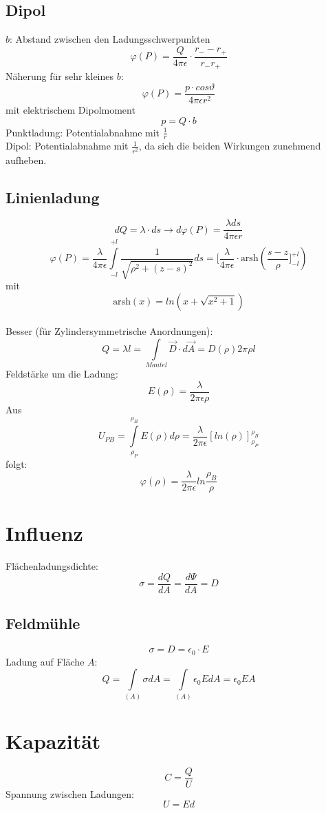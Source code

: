 \documentclass[12pt,a4paper]{article}
\begin{document}
\subsection{Dipol}
$b$: Abstand zwischen den Ladungsschwerpunkten
\[\varphi(P) = \frac{Q}{4\pi\epsilon} \cdot \frac{r_- -r_+}{r_-r_+}\]
Näherung für sehr kleines $b$:
\[\varphi(P) = \frac{p \cdot cos\vartheta}{4\pi\epsilon r^2}\]
mit elektrischem Dipolmoment \[p = Q \cdot b\]
Punktladung: Potentialabnahme mit $\frac{1}{r}$\\
Dipol: Potentialabnahme mit $\frac{1}{r^2}$,  da sich die beiden Wirkungen zunehmend aufheben.\\

\subsection{Linienladung}
\[dQ = \lambda \cdot ds \rightarrow d\varphi(P) = \frac{\lambda ds}{4\pi\epsilon r}\]
\[\varphi(P) = \frac{\lambda}{4\pi\epsilon}\int\limits_{-l}^{+l}{\frac{1}{\sqrt{\rho^2+(z-s)^2}}ds} = [\frac{\lambda}{4\pi\epsilon} \cdot \text{arsh} (\frac{s-z}{\rho}]_{-l}^{+l})\] 
mit 
\[\text{arsh} (x) = ln(x+\sqrt{x^2+1})\]
\\
Besser (für Zylindersymmetrische Anordnungen):
\[Q = \lambda l = \int\limits_{Mantel}{\vec{D} \cdot d\vec{A}} = D(\rho)2\pi\rho l\]
Feldstärke um die Ladung:
\[E(\rho) = \frac{\lambda}{2\pi\epsilon \rho}\]
Aus
\[U_{PB} = \int\limits_{\rho_P}^{\rho_B}{E(\rho)d\rho}= \frac{\lambda}{2\pi\epsilon}[ln(\rho)]_{\rho_P}^{\rho_B}\]
folgt:
\[\varphi(\rho) = \frac{\lambda}{2\pi\epsilon}ln\frac{\rho_B}{\rho}\]

\section{Influenz}
Flächenladungsdichte:
\[\sigma = \frac{dQ}{dA} = \frac{d\Psi}{dA}= D\]

\subsection{Feldmühle}
\[\sigma = D = \epsilon_0 \cdot E\]
Ladung auf Fläche $A$:
\[Q = \int\limits_{(A)}{\sigma dA} = \int\limits_{(A)}{\epsilon_0 EdA} = \epsilon_0 EA\]

\section{Kapazität}
\[C = \frac{Q}{U}\]
Spannung zwischen Ladungen:
\[U = Ed\]
\end{document}
